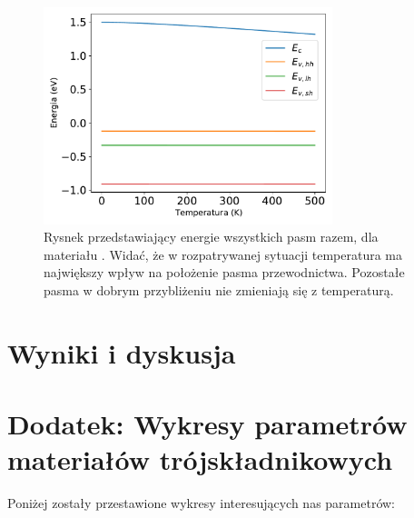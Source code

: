 \documentclass[12pt,openany,a4paper]{book}
\begin{document}
\begin{figure}[H]
	\centering
	\includegraphics[width = 0.75\textwidth]{Figures/strain/one.pdf}
	\caption{Rysnek przedstawiający energie wszystkich pasm razem, dla materiału 
	. Widać, że w rozpatrywanej sytuacji temperatura
	ma największy wpływ na położenie pasma przewodnictwa. Pozostałe pasma w dobrym przybliżeniu nie zmieniają się
	z temperaturą.}
	\label{fig:allE}
\end{figure}

\chapter{Wyniki i dyskusja}\label{chapt:results}


\chapter*{Dodatek: Wykresy parametrów materiałów trójskładnikowych}\label{chapt:dodatek}
Poniżej zostały przestawione wykresy interesujących nas parametrów:
\end{document}
